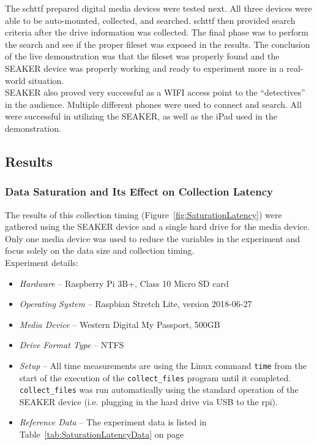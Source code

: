 \documentclass[12pt]{article}
\begin{document}
The \gls{schttf} prepared digital media devices were tested next.  All three devices
were able to be auto-mounted, collected, and searched.  \gls{schttf} then provided
search criteria after the drive information was collected.  The final phase was to perform the
search and see if the proper fileset was exposed in the results.  The conclusion
of the live demonstration was that the fileset was properly found and the SEAKER
device was properly working and ready to experiment more in a real-world situation.\\

SEAKER also proved very successful as a WIFI access point to the ``detectives'' in
the audience.  Multiple different phones were used to connect and search.  All were
successful in utilizing the SEAKER, as well as the iPad used in the demonstration. 

\subsection{Results}

\subsubsection{Data Saturation and Its Effect on Collection Latency}

The results of this collection timing (Figure~\ref{fig:SaturationLatency})
were gathered using the SEAKER device and a single hard drive for the media device.
Only one media device was used to reduce the variables in the experiment and focus
solely on the data size and collection timing.\\

Experiment details:

\begin{itemize}
  \item {\em Hardware} -- Raspberry Pi 3B+, Class 10 Micro SD card
  \item {\em Operating System} -- Raspbian Stretch Lite, version 2018-06-27
  \item {\em Media Device} -- Western Digital My Passport\texttrademark, 500GB
  \item {\em Drive Format Type} -- NTFS
  \item {\em Setup} -- All time measurements are using the Linux 
  command \verb|time| from the start of the execution of the \verb|collect_files|
  program until it completed.  \verb|collect_files| was run automatically
  using the standard operation of the SEAKER device (i.e. plugging in the hard
  drive via USB to the \gls{rpi}).
  \item {\em Reference Data} -- The experiment data is listed in
  Table~\ref{tab:SaturationLatencyData} on page~\pageref{tab:SaturationLatencyData}
\end{itemize}
\end{document}
